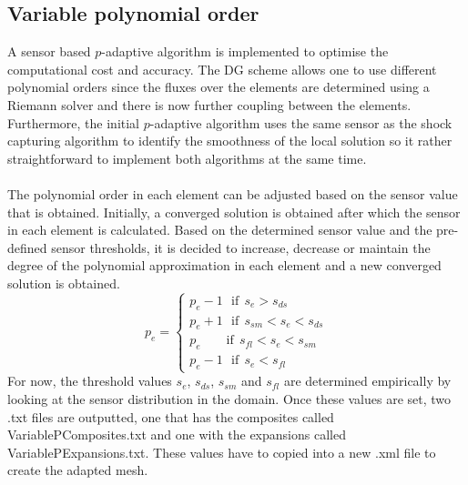 \subsection{Variable polynomial order}
A sensor based $p$-adaptive algorithm is implemented to optimise the computational cost and accuracy. 
The DG scheme allows one to use different polynomial orders since the fluxes over the elements are determined using a Riemann solver and there is now further coupling between the elements. Furthermore, the initial $p$-adaptive algorithm uses the same sensor as the shock capturing algorithm to identify the smoothness of the local solution so it rather straightforward to implement both algorithms at the same time.\\
\\
The polynomial order in each element can be adjusted based on the sensor value that is obtained. Initially, a converged solution is obtained after which the sensor in each element is calculated. Based on the determined sensor value and the pre-defined sensor thresholds, it is decided to increase, decrease or maintain the degree of the polynomial approximation in each element and a new converged solution is obtained.\\
\begin{equation}\label{eq:pswitch}
  p_e =\left \{ \begin{array}{l}
    p_e-1\	\	\ \mbox{if}\		\	 s_e>s_{ds}\\  
    p_e+1\	\	\ \mbox{if}\		\	 s_{sm }<s_e<s_{ds}\\
    p_e\	\	\	\	\	\	\	\	\	 \mbox{if}\		\ s_{fl}<s_e<s_{sm}\\
    p_e-1\	\	\ \mbox{if}\		\	 s_e<s_{fl}
    \end{array} 
    \right.
\end{equation}
For now, the threshold values $s_e$, $s_{ds}$, $s_{sm}$ and $s_{fl}$ are determined empirically by looking at the sensor distribution in the domain. Once these values are set, two .txt files are outputted, one that has the composites called VariablePComposites.txt and one with the expansions called VariablePExpansions.txt. These values have to copied into a new .xml file to create the adapted mesh.


